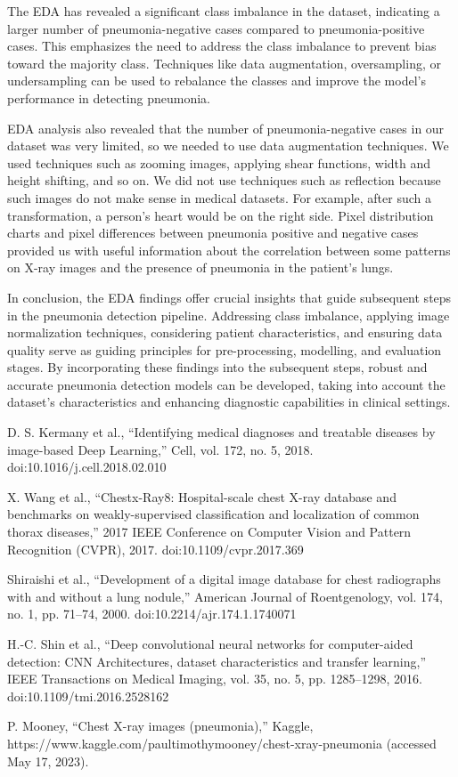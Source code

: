 \documentclass[9pt,twocolumn,twoside]{opticajnl}
\begin{document}
The EDA has revealed a significant class imbalance in the dataset, indicating a larger number of pneumonia-negative cases compared to pneumonia-positive cases. This emphasizes the need to address the class imbalance to prevent bias toward the majority class. Techniques like data augmentation, oversampling, or undersampling can be used to rebalance the classes and improve the model's performance in detecting pneumonia.


EDA analysis also revealed that the number of pneumonia-negative cases in our dataset was very limited, so we needed to use data augmentation techniques. We used techniques such as zooming images, applying shear functions, width and height shifting, and so on. We did not use techniques such as reflection because such images do not make sense in medical datasets. For example, after such a transformation, a person's heart would be on the right side. Pixel distribution charts and pixel differences between pneumonia positive and negative cases provided us with useful information about the correlation between some patterns on X-ray images and the presence of pneumonia in the patient's lungs.


In conclusion, the EDA findings offer crucial insights that guide subsequent steps in the pneumonia detection pipeline. Addressing class imbalance, applying image normalization techniques, considering patient characteristics, and ensuring data quality serve as guiding principles for pre-processing, modelling, and evaluation stages. By incorporating these findings into the subsequent steps, robust and accurate pneumonia detection models can be developed, taking into account the dataset's characteristics and enhancing diagnostic capabilities in clinical settings.


\begin{thebibliography}{9}
D. S. Kermany et al., “Identifying medical diagnoses and treatable diseases by image-based Deep Learning,” Cell, vol. 172, no. 5, 2018. doi:10.1016/j.cell.2018.02.010

X. Wang et al., “Chestx-Ray8: Hospital-scale chest X-ray database and benchmarks on weakly-supervised classification and localization of common thorax diseases,” 2017 IEEE Conference on Computer Vision and Pattern Recognition (CVPR), 2017. doi:10.1109/cvpr.2017.369

Shiraishi et al., “Development of a digital image database for chest radiographs with and without a lung nodule,” American Journal of Roentgenology, vol. 174, no. 1, pp. 71–74, 2000. doi:10.2214/ajr.174.1.1740071

H.-C. Shin et al., “Deep convolutional neural networks for computer-aided detection: CNN Architectures, dataset characteristics and transfer learning,” IEEE Transactions on Medical Imaging, vol. 35, no. 5, pp. 1285–1298, 2016. doi:10.1109/tmi.2016.2528162

P. Mooney, “Chest X-ray images (pneumonia),” Kaggle, https://www.kaggle.com/paultimothymooney/chest-xray-pneumonia (accessed May 17, 2023). 

\end{thebibliography}
\end{document}
